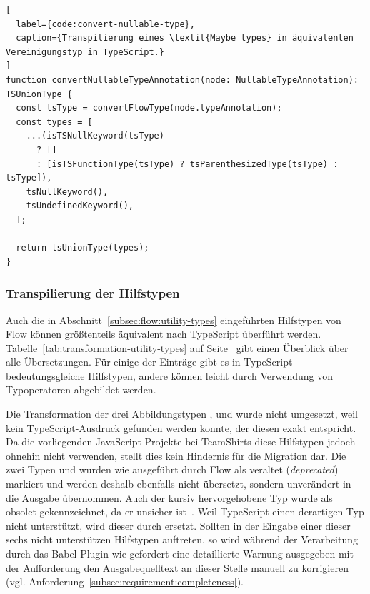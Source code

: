{\begin{lstlisting}[
  label={code:convert-nullable-type},
  caption={Transpilierung eines \textit{Maybe types} in äquivalenten Vereinigungstyp in TypeScript.}
]
function convertNullableTypeAnnotation(node: NullableTypeAnnotation): TSUnionType {
  const tsType = convertFlowType(node.typeAnnotation);
  const types = [
    ...(isTSNullKeyword(tsType)
      ? []
      : [isTSFunctionType(tsType) ? tsParenthesizedType(tsType) : tsType]),
    tsNullKeyword(),
    tsUndefinedKeyword(),
  ];

  return tsUnionType(types);
}
\end{lstlisting}

\subsubsection{Transpilierung der Hilfstypen}

Auch die in Abschnitt~\ref{subsec:flow:utility-types} eingeführten Hilfstypen von Flow können größtenteils äquivalent nach TypeScript überführt werden. Tabelle~\ref{tab:transformation-utility-types} auf Seite~\pageref{tab:transformation-utility-types} gibt einen Überblick über alle Übersetzungen. Für einige der Einträge gibt es in TypeScript bedeutungsgleiche Hilfstypen, andere können leicht durch Verwendung von Typoperatoren abgebildet werden.

Die Transformation der drei Abbildungstypen ,  und  wurde nicht umgesetzt, weil kein TypeScript-Ausdruck gefunden werden konnte, der diesen exakt entspricht. Da die vorliegenden JavaScript-Projekte bei TeamShirts diese Hilfstypen jedoch ohnehin nicht verwenden, stellt dies kein Hindernis für die Migration dar. Die zwei Typen  und  wurden wie ausgeführt durch Flow als veraltet (\textit{deprecated}) markiert und werden deshalb ebenfalls nicht übersetzt, sondern unverändert in die Ausgabe übernommen. Auch der kursiv hervorgehobene Typ  wurde als obsolet gekennzeichnet, da er unsicher ist~\autocite{FLOW:LINT_RULE_REFERENCE}. Weil TypeScript einen derartigen Typ nicht unterstützt, wird dieser durch  ersetzt. Sollten in der Eingabe einer dieser sechs nicht unterstützen Hilfstypen auftreten, so wird während der Verarbeitung durch das Babel-Plugin wie gefordert eine detaillierte Warnung ausgegeben mit der Aufforderung den Ausgabequelltext an dieser Stelle manuell zu korrigieren (vgl. Anforderung~\ref{subsec:requirement:completeness}).

}
